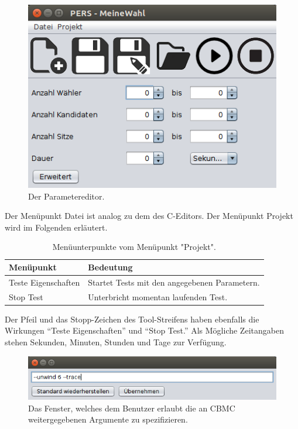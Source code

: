 \documentclass[a4paper]{scrreprt}
\begin{document}
\begin{figure}[H]
\includegraphics[scale=0.6]{Parameter-Editor.png}
\caption{Der Parametereditor.}
\label{Parameter-editor}
\end{figure}

Der Menüpunkt Datei ist analog zu dem des C-Editors. Der Menüpunkt Projekt wird im Folgenden erläutert. 

\begin{table}[H]
\begin{tabular}{|p{5cm}|p{10cm}|}
Menüpunkt & Bedeutung \\
\hline
Teste Eigenschaften & Startet Tests mit den angegebenen Parametern. \\ \hline
Stop Test & Unterbricht momentan laufenden Test.
\end{tabular}
\label{Parameter-Projekt-Menü}
\caption{Menüunterpunkte vom Menüpunkt "Projekt".}
\end{table}

Der Pfeil und das Stopp-Zeichen des Tool-Streifens haben ebenfalls die Wirkungen "`Teste Eigenschaften"' und "`Stop Test."' Als Mögliche Zeitangaben stehen Sekunden, Minuten, Stunden und Tage zur Verfügung. 

\begin{figure}[H]
\includegraphics[scale=0.6]{CBMC-Args-Editor.png}
\caption{Das Fenster, welches dem \gls{Benutzer} erlaubt die an CBMC weitergegebenen Argumente zu spezifizieren.}
\label{Argumente-editor}
\end{figure}
\end{document}
